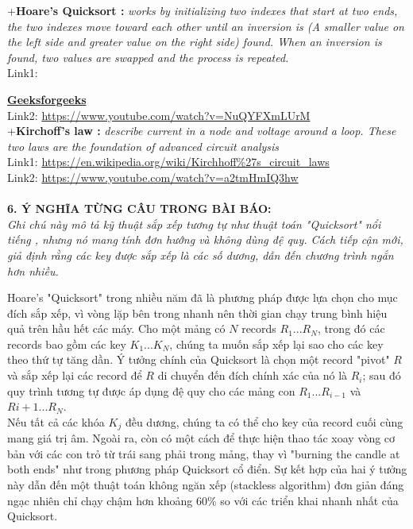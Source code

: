 \documentclass[12pt,a4paper]{article}
\begin{document}
   \noindent+\textbf{Hoare’s Quicksort :}\textit{ works by initializing two indexes that start at two ends, the two indexes move toward each other until an inversion is (A smaller value on the left side and greater value on the right side) found. When an inversion is found, two values are swapped and the process is repeated. }\\
    \indent \textbullet\hspace{0.3cm} Link1: {\href{https://www.geeksforgeeks.org/hoares-vs-lomuto-partition-scheme-quicksort/}{\textbf{Geeksforgeeks}}\\
       \indent \textbullet\hspace{0.3cm} Link2: \url{https://www.youtube.com/watch?v=NuQYFXmLUrM}\\
        \noindent+\textbf{Kirchoff's law :}\textit{  describe current in a node and voltage around a loop. These two laws are the foundation of advanced circuit analysis }\\
     \indent \textbullet\hspace{0.3cm} Link1: \url{https://en.wikipedia.org/wiki/Kirchhoff%27s_circuit_laws}\\
    \indent \textbullet\hspace{0.3cm} Link2: \url{https://www.youtube.com/watch?v=a2tmHmIQ3hw}\\\\
     \noindent\textbf{6. Ý NGHĨA TỪNG CÂU TRONG BÀI BÁO: }\\
 \indent \textit{   Ghi chú này mô tả kỹ thuật sắp xếp tương tự như thuật toán "Quicksort" nổi tiếng , nhưng nó mang tính đơn hướng và không dùng đệ quy. Cách tiếp cận mới, giả định rằng các key được sắp xếp là các số dương, dẫn đến chương trình ngắn hơn nhiều.} 
     
     
     Hoare's "Quicksort" trong nhiều năm đã là phương pháp được lựa chọn cho mục đích  sắp xếp, vì vòng lặp bên trong nhanh  nên thời gian chạy trung bình hiệu quả trên hầu hết các máy. Cho một mảng có $ N $ records $ R_1... R_N $, trong đó các records bao gồm các key $ K_1... K_N $, chúng ta muốn sắp xếp lại sao cho các key theo thứ tự tăng dần. Ý tưởng chính của Quicksort là chọn một record "pivot" $ R $ và sắp xếp lại các record để $ R $ di chuyển đến đích chính xác của nó là $ R_i $; sau đó quy trình tương tự được áp dụng đệ quy cho các mảng con $ R_1... R_{i-1} $ và $  R{i+1} ... R_{N} $. \\
     \indent Nếu tất cả các khóa $ K_j $ đều dương, chúng ta có thể cho key của  record cuối cùng mang giá trị âm. Ngoài ra, còn có một cách để thực hiện thao tác xoay vòng cơ bản với các con trỏ  từ trái sang phải trong mảng, thay vì "burning the candle at both ends" như trong phương pháp Quicksort cổ điển. Sự kết hợp của hai ý tưởng này dẫn đến một thuật toán không ngăn xếp  (stackless algorithm) đơn giản đáng ngạc nhiên chỉ chạy chậm hơn khoảng 60\% so với các triển khai nhanh nhất của Quicksort. \\
     
}
\end{document}
